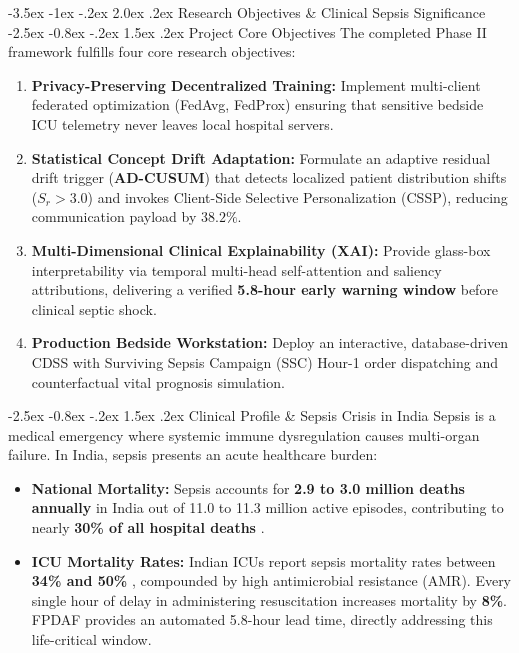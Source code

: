 \documentclass[11pt, a4paper]{article}
\makeatletter
\renewcommand\section{\@startsection {section}{1}{\z@}%
                                   {-3.5ex \@plus -1ex \@minus -.2ex}%
                                   {2.0ex \@plus.2ex}%
                                   {\normalfont\large\bfseries\color{amritaMaroon}}}
\renewcommand\subsection{\@startsection {subsection}{2}{\z@}%
                                   {-2.5ex \@plus -0.8ex \@minus -.2ex}%
                                   {1.5ex \@plus.2ex}%
                                   {\normalfont\normalsize\bfseries\color{slateNavy}}}
\makeatother
\begin{document}
\section{Research Objectives \& Clinical Sepsis Significance}
\subsection{Project Core Objectives}
The completed Phase II framework fulfills four core research objectives:
\begin{enumerate}
    \item \textbf{Privacy-Preserving Decentralized Training:} Implement multi-client federated optimization (FedAvg, FedProx) ensuring that sensitive bedside ICU telemetry never leaves local hospital servers.
    \item \textbf{Statistical Concept Drift Adaptation:} Formulate an adaptive residual drift trigger (\textbf{AD-CUSUM}) that detects localized patient distribution shifts ($S_r > 3.0$) and invokes Client-Side Selective Personalization (CSSP), reducing communication payload by $38.2\%$.
    \item \textbf{Multi-Dimensional Clinical Explainability (XAI):} Provide glass-box interpretability via temporal multi-head self-attention and saliency attributions, delivering a verified \textbf{5.8-hour early warning window} before clinical septic shock.
    \item \textbf{Production Bedside Workstation:} Deploy an interactive, database-driven CDSS with Surviving Sepsis Campaign (SSC) Hour-1 order dispatching and counterfactual vital prognosis simulation.
\end{enumerate}

\subsection{Clinical Profile \& Sepsis Crisis in India}
Sepsis is a medical emergency where systemic immune dysregulation causes multi-organ failure. In India, sepsis presents an acute healthcare burden:
\begin{itemize}
    \item \textbf{National Mortality:} Sepsis accounts for \textbf{2.9 to 3.0 million deaths annually} in India out of 11.0 to 11.3 million active episodes, contributing to nearly \textbf{30\% of all hospital deaths} \cite{kalakoti2025fedxai}.
    \item \textbf{ICU Mortality Rates:} Indian ICUs report sepsis mortality rates between \textbf{34\% and 50\%} \cite{dusing2025sepsis}, compounded by high antimicrobial resistance (AMR). Every single hour of delay in administering resuscitation increases mortality by \textbf{8\%}. FPDAF provides an automated 5.8-hour lead time, directly addressing this life-critical window.
\end{itemize}
\end{document}
